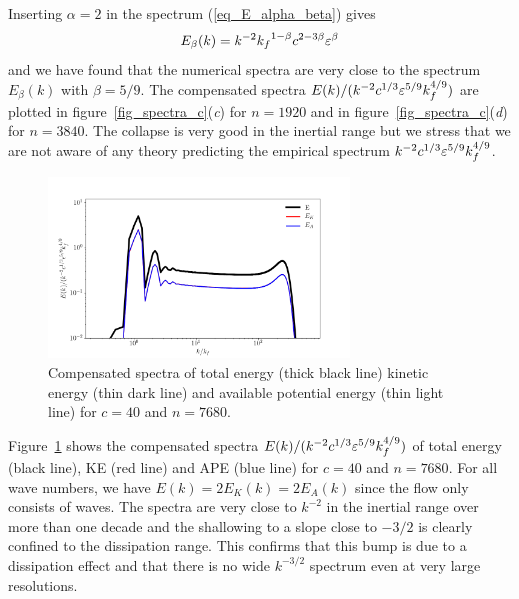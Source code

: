 Inserting $\alpha = 2$ in the spectrum (\ref{eq_E_alpha_beta}) gives
\begin{equation}
E_\beta(k) = k^{-2} {k_f}^{1-\beta} c^{2-3\beta} \varepsilon^\beta  
\end{equation}
and we have found that the numerical spectra are very close to the
spectrum $E_\beta(k)$ with $\beta = 5/9$.
%
The compensated spectra $E(k) / ( k^{-2} c^{1/3} \varepsilon^{5/9} k_f^{4/9}
)$ are plotted in figure~\ref{fig_spectra_c}(\textit{c}) for $n =
1920$ and in figure~\ref{fig_spectra_c}(\textit{d}) for $n = 3840$.
The collapse is very good in the inertial range but we stress that we
are not aware of any theory predicting the empirical spectrum $k^{-2}
c^{1/3} \varepsilon^{5/9} k_f^{4/9}$.





\begin{figure}
\centerline{\includegraphics[width=8cm]{../Pyfig/fig_spectra_c=100_nh=7680}}
\caption{Compensated spectra
of total energy (thick black line)
kinetic energy (thin dark line) and
available potential energy (thin light line)
for $c = 40$ and $n = 7680$.}
\label{fig_spectra_c40}
\end{figure}

Figure~\ref{fig_spectra_c40} shows the compensated spectra $E(k) / (
k^{-2} c^{1/3} \varepsilon^{5/9} k_f^{4/9} )$ of total energy (black line),
KE (red line) and APE (blue line) for $c = 40$ and $n = 7680$.  For
all wave numbers, we have $E(k) = 2E_K(k) = 2E_A(k)$ since the flow
only consists of  waves.
%
The spectra are very close to $k^{-2}$ in the inertial range over more
than one decade and the shallowing to a slope close to $-3/2$ is
clearly confined to the dissipation range.  This confirms that this
bump is due to a dissipation effect and that there is no wide
$k^{-3/2}$ spectrum even at very large resolutions.



